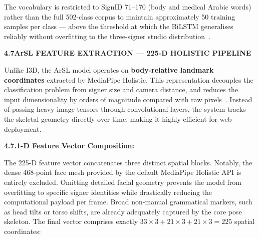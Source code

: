 \noindent The vocabulary is restricted to SignID 71--170 (body and medical Arabic words) rather than the full 502-class corpus to maintain approximately 50 training samples per class --- above the threshold at which the BiLSTM generalises reliably without overfitting to the three-signer studio distribution~\cite{sidig2021karsl}.\par\vspace{0.3cm} %

\noindent\textbf{4.7\quad ArSL FEATURE EXTRACTION --- 225-D HOLISTIC PIPELINE}\par
{}
\vspace{0.4cm}

\noindent Unlike I3D, the ArSL model operates on \textbf{body-relative landmark coordinates} extracted by MediaPipe Holistic. This representation decouples the classification problem from signer size and camera distance, and reduces the input dimensionality by orders of magnitude compared with raw pixels~\cite{zhang2020mediapipe}. Instead of passing heavy image tensors through convolutional layers, the system tracks the skeletal geometry directly over time, making it highly efficient for web deployment.\par\vspace{0.4cm}

\noindent\textbf{4.7.1-D Feature Vector Composition:}\par
{}
\vspace{0.3cm}

\noindent The 225-D feature vector concatenates three distinct spatial blocks. Notably, the dense 468-point face mesh provided by the default MediaPipe Holistic API is entirely excluded. Omitting detailed facial geometry prevents the model from overfitting to specific signer identities while drastically reducing the computational payload per frame. Broad non-manual grammatical markers, such as head tilts or torso shifts, are already adequately captured by the core pose skeleton. The final vector comprises exactly $33{\times}3 + 21{\times}3 + 21{\times}3 = 225$ spatial coordinates:\par\vspace{0.3cm}

